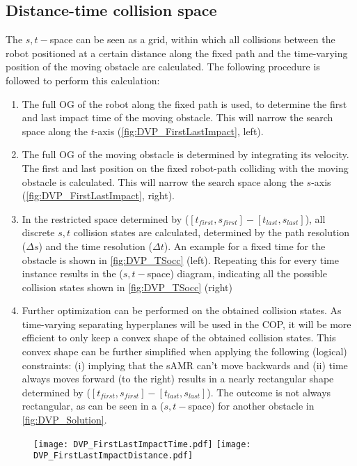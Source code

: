 \subsection{Distance-time collision space} \label{sec:STspace}
The $s,t-$space can be seen as a grid, within which all collisions between the robot positioned at a certain distance along the fixed path and the time-varying position of the moving obstacle are calculated. The following procedure is followed to perform this calculation:
\begin{enumerate}
\item The full OG of the robot along the fixed path is used, to determine the first and last impact time of the moving obstacle. This will narrow the search space along the $t$-axis (\cref{fig:DVP_FirstLastImpact}, left).
\item The full OG of the moving obstacle is determined by integrating its velocity. The first and last position on the fixed robot-path colliding with the moving obstacle is calculated. This will narrow the search space along the $s$-axis (\cref{fig:DVP_FirstLastImpact}, right).
\item In the restricted space determined by ($[t_{first},s_{first}]-[t_{last},s_{last}]$), all discrete $s,t$ collision states are calculated, determined by the path resolution ($\Delta s$) and the time resolution ($\Delta t$). An example for a fixed time for the obstacle is shown in \cref{fig:DVP_TSocc} (left). Repeating this for every time instance results in the ($s,t-$space) diagram, indicating all the possible collision states shown in \cref{fig:DVP_TSocc} (right)
\item Further optimization can be performed on the obtained collision states. As time-varying separating hyperplanes will be used in the COP, it will be more efficient to only keep a convex shape of the obtained collision states. This convex shape can be further simplified when applying the following (logical) constraints: (i) implying that the sAMR can't move backwards and (ii) time always moves forward (to the right) results in a nearly rectangular shape determined by ($[t_{first},s_{first}]-[t_{last},s_{last}]$). The outcome is not always rectangular, as can be seen in a ($s,t-$space) for another obstacle in \cref{fig:DVP_Solution}.
\end{enumerate}

\begin{figure}[!htbp]
\centering
\texttt{[image: DVP\_FirstLastImpactTime.pdf]}
\hfill
\texttt{[image: DVP\_FirstLastImpactDistance.pdf]}
\end{figure}

